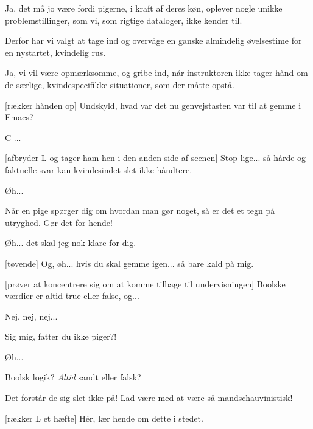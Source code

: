 \documentclass[a4paper,11pt]{article}
\begin{document}
\begin{sketch}
   Ja, det må jo være fordi pigerne, i kraft af deres køn,
  oplever nogle unikke problemstillinger, som vi, som rigtige
  dataloger, ikke kender til.

   Derfor har vi valgt at tage ind og overvåge en ganske
  almindelig øvelsestime for en nystartet, kvindelig rus.

   Ja, vi vil være opmærksomme, og gribe ind, når
  instruktoren ikke tager hånd om de særlige, kvindespecifikke
  situationer, som der måtte opstå.


  [rækker hånden op] Undskyld, hvad var det nu genvejstasten
  var til at gemme i Emacs?

   C-...

  [afbryder L og tager ham hen i den anden side af scenen]
  Stop lige... så hårde og faktuelle svar kan kvindesindet slet ikke
  håndtere.

   Øh...

   Når en pige spørger dig om hvordan man gør noget, så er
  det et tegn på utryghed.  Gør det for hende!


   Øh... det skal jeg nok klare for dig.


  [tøvende] Og, øh... hvis du skal gemme igen... så bare kald
  på mig.


  [prøver at koncentrere sig om at komme tilbage til
  undervisningen] Boolske værdier er altid true eller false, og...


   Nej, nej, nej...

   Sig mig, fatter du ikke piger?!

   Øh...

   Boolsk logik?  \textit{Altid} sandt eller falsk?

   Det forstår de sig slet ikke på!  Lad være med at være så
  mandschauvinistisk!

  [rækker L et hæfte] Hér, lær hende om dette i stedet.


\end{sketch}
\end{document}
